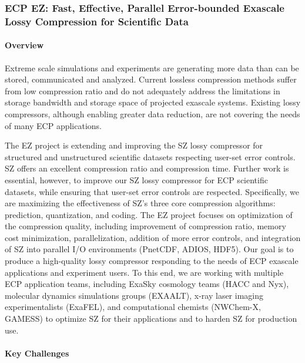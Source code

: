 \subsubsection{ECP EZ: Fast, Effective, Parallel Error-bounded Exascale Lossy Compression for Scientific Data}

\paragraph{Overview}

Extreme scale simulations and experiments are generating more data than can be stored, communicated and analyzed. Current lossless compression methods suffer from low compression ratio and do not adequately address the limitations in storage bandwidth and storage space of projected exascale systems. Existing lossy compressors, although enabling greater data reduction, are not covering the needs of many ECP applications.

The EZ project is extending and improving the SZ lossy compressor for structured and unstructured scientific datasets respecting user-set error controls. SZ offers an excellent compression ratio and compression time. Further work is essential, however, to improve our SZ lossy compressor for ECP scientific datasets, while ensuring that user-set error controls are respected. Specifically, we are maximizing the effectiveness of SZ’s three core compression algorithms: prediction, quantization, and coding. The EZ project focuses on optimization of the compression quality, including improvement of compression ratio, memory cost minimization, parallelization, addition of more error controls, and integration of SZ into parallel I/O environments (PnetCDF, ADIOS, HDF5). Our goal is to produce a high-quality lossy compressor responding to the needs of ECP exascale applications and experiment users. To this end, we are working with multiple ECP application teams, including ExaSky cosmology teams (HACC and Nyx), molecular dynamics simulations groups (EXAALT), x-ray laser imaging experimentalists (ExaFEL), and computational chemists (NWChem-X, GAMESS) to optimize SZ for their applications and to harden SZ for production use.

\paragraph{Key Challenges}

